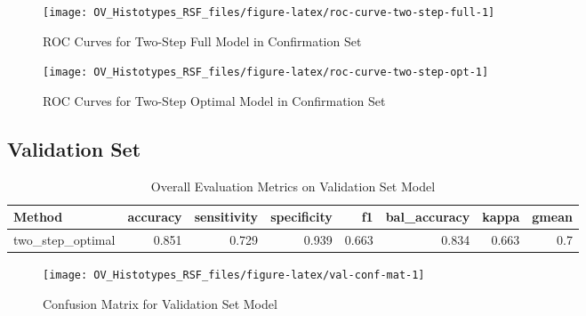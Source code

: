 \documentclass[
]{report}
\begin{document}
\begin{figure}[H]

{\centering \texttt{[image: OV\_Histotypes\_RSF\_files/figure-latex/roc-curve-two-step-full-1]} 

}

\caption{ROC Curves for Two-Step Full Model in Confirmation Set}\label{fig:roc-curve-two-step-full}
\end{figure}

\begin{figure}[H]

{\centering \texttt{[image: OV\_Histotypes\_RSF\_files/figure-latex/roc-curve-two-step-opt-1]} 

}

\caption{ROC Curves for Two-Step Optimal Model in Confirmation Set}\label{fig:roc-curve-two-step-opt}
\end{figure}

\subsection{Validation Set}\label{validation-set}

\begin{table}

\caption{\label{tab:val-eval-overall}Overall Evaluation Metrics on Validation Set Model}
\centering
\begin{tabular}[t]{l|r|r|r|r|r|r|r}
\hline
Method & accuracy & sensitivity & specificity & f1 & bal\_accuracy & kappa & gmean\\
\hline
two\_step\_optimal & 0.851 & 0.729 & 0.939 & 0.663 & 0.834 & 0.663 & 0.7\\
\hline
\end{tabular}
\end{table}

\begin{figure}[H]

{\centering \texttt{[image: OV\_Histotypes\_RSF\_files/figure-latex/val-conf-mat-1]} 

}

\caption{Confusion Matrix for Validation Set Model}\label{fig:val-conf-mat}
\end{figure}
\end{document}
